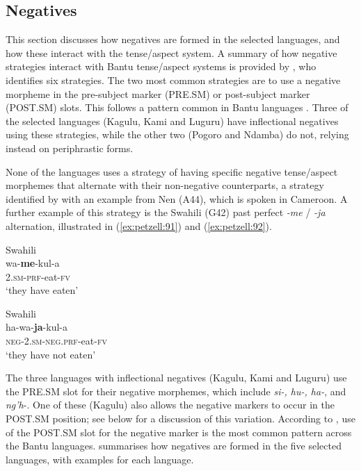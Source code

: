 \documentclass[output=paper,
            colorlinks, citecolor=brown
            ,draftmode
		  ]{langscibook}
\begin{document}
\subsection{Negatives}
\label{sec:petzell:4.6}
This section discusses how negatives are formed in the selected languages, and how these interact with the tense/aspect system. A summary of how negative strategies interact with Bantu tense/aspect systems is provided by \citet[180--184]{Nurse2008}, who identifies six strategies. The two most common strategies are to use a negative morpheme in the pre-subject marker (PRE.SM) or post-subject marker (POST.SM) slots. This follows a pattern common in Bantu languages \citep{GuéroisEtAlToAppear}. Three of the selected languages (Kagulu, Kami and Luguru) have inflectional negatives using these strategies, while the other two (Pogoro and Ndamba) do not, relying instead on periphrastic forms.



None of the languages uses a strategy of having specific negative tense/aspect morphemes that alternate with their non-negative counterparts, a strategy identified by \citet[34]{Nurse2008} with an example from Nen (A44), which is spoken in Cameroon. A further example of this strategy is the Swahili (G42) past perfect \textit{{}-me} / \textit{{}-ja} alternation, illustrated in  (\ref{ex:petzell:91}) and (\ref{ex:petzell:92}).

\largerpage
\ea\label{ex:petzell:91}Swahili\\
\gll wa-\textbf{me}{}-kul-a \\
\textsc{2.sm-{prf}}{}-eat-\textsc{fv}\\
\glt `they have eaten'


\ex\label{ex:petzell:92}Swahili\\
\gll ha-wa-\textbf{ja}{}-kul-a \\
\textsc{neg-2.sm-{neg.prf}}{}-eat-\textsc{fv}\\
\glt `they have not eaten'
\z


The three languages with inflectional negatives (Kagulu, Kami and Luguru) use the PRE.SM slot for their negative morphemes, which include \textit{si-, hu-, ha-}, and \textit{ng'h}{}-. One of these (Kagulu) also allows the negative markers to occur in the POST.SM position; see  below for a discussion of this variation. According to \citet[180]{Nurse2008}, use of the POST.SM slot for the negative marker is the most common pattern across the Bantu languages.  summarises how negatives are formed in the five selected languages, with examples for each language.
\end{document}

